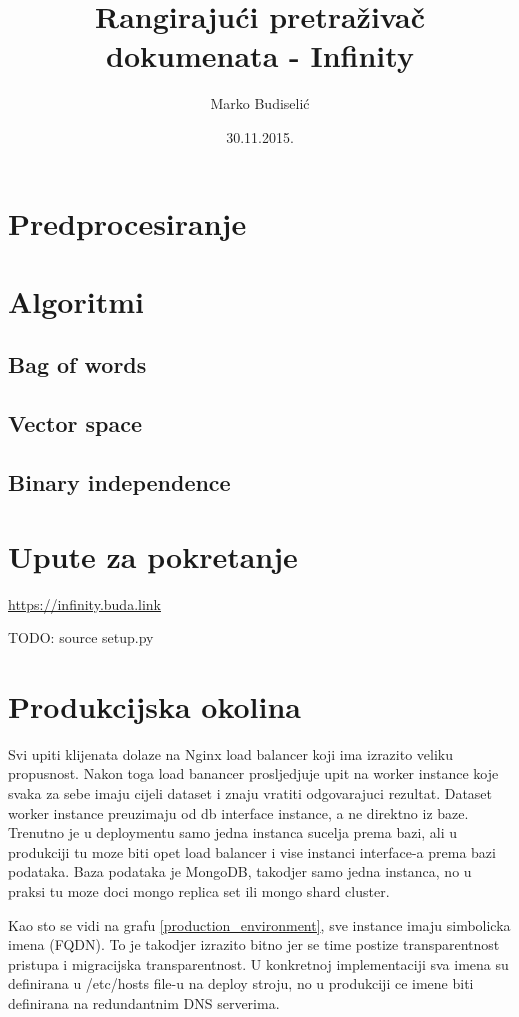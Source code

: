 \documentclass[a4paper]{article}
\title{Rangirajući pretraživač dokumenata - Infinity}
\author{Marko Budiselić}
\date{30.11.2015.}
\begin{document}
\maketitle

\section{Predprocesiranje}

\section{Algoritmi}

\subsection{Bag of words}

\subsection{Vector space}

\subsection{Binary independence}

\section{Upute za pokretanje}

\url{https://infinity.buda.link}

TODO: source setup.py

\section{Produkcijska okolina}

Svi upiti klijenata dolaze na Nginx load balancer koji ima izrazito veliku propusnost. Nakon toga load banancer prosljedjuje upit na worker instance koje svaka za sebe imaju cijeli dataset i znaju vratiti odgovarajuci rezultat. Dataset worker instance preuzimaju od db interface instance, a ne direktno iz baze. Trenutno je u deploymentu samo jedna instanca sucelja prema bazi, ali u produkciji tu moze biti opet load balancer i vise instanci interface-a prema bazi podataka. Baza podataka je MongoDB, takodjer samo jedna instanca, no u praksi tu moze doci mongo replica set ili mongo shard cluster.

Kao sto se vidi na grafu \ref{production_environment}, sve instance imaju simbolicka imena (FQDN). To je takodjer izrazito bitno jer se time postize transparentnost pristupa i migracijska transparentnost. U konkretnoj implementaciji sva imena su definirana u /etc/hosts file-u na deploy stroju, no u produkciji ce imene biti definirana na redundantnim DNS serverima.
\end{document}
